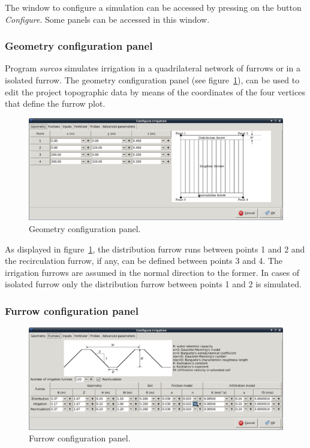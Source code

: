 \documentclass[review,authoryear]{elsarticle}
\begin{document}
The window to configure a simulation can be accessed by pressing on the button
\emph{Configure}. Some panels can be accessed in this window.

\subsubsection{Geometry configuration panel}

Program \emph{surcos} simulates irrigation in a quadrilateral network of
furrows or in a isolated furrow. The geometry configuration panel (see
figure~\ref{geomWindow}), can be used to edit the project topographic data by
means of the coordinates of the four vertices that define the furrow plot.

\begin{figure}[!ht]
\begin{center}
\includegraphics[width=1125\UNIT]{confGeomEN.eps}
\caption{Geometry configuration panel.}\label{geomWindow}
\end{center}
\end{figure}

As displayed in figure~\ref{geomWindow}, the distribution furrow runs between
points 1 and 2 and the recirculation furrow, if any, can be defined between
points 3 and 4. The irrigation furrows are assumed in the normal direction to
the former. In cases of isolated furrow only the distribution furrow between
points 1 and 2 is simulated.

\subsubsection{Furrow configuration panel}

\begin{figure}[!ht]
\begin{center}
\includegraphics[width=1125\UNIT]{confSurcoEN.eps}
\caption{Furrow configuration panel.}\label{confSurcos}
\end{center}
\end{figure}
\end{document}
